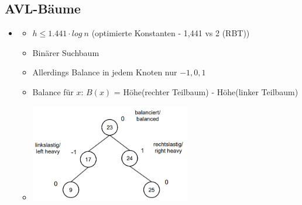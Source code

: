 \documentclass[
    12pt,
    a4paper,
    ngerman,
    color=3b,%
    marginpar=false,
    colorback=false,
    leqno,
]{tudaexercise}
\begin{document}
    \subsection{AVL-Bäume}\label{AVL-Baeume}
    \begin{itemize}
        \item {}
            \begin{itemize}
                \item $h \leq 1.441 \cdot log~n$ (optimierte Konstanten - 1,441 vs 2 (RBT))
                \item Binärer Suchbaum
                \item Allerdings Balance in jedem Knoten nur $-1,0,1$
                \item Balance für $x$: $B(x)$ = Höhe(rechter Teilbaum) - Höhe(linker Teilbaum)
                \item[] \includegraphics[width=7cm]{pictures/avlbaum.PNG}
            \end{itemize}
        

\end{itemize}
\end{document}

